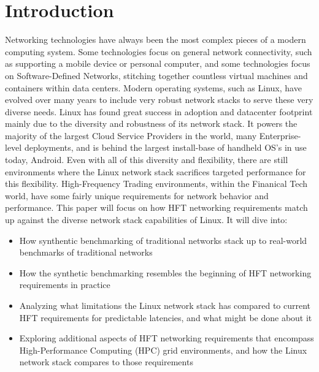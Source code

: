 \documentclass[letterpaper]{article}
\begin{document}
\section{Introduction}
Networking technologies have always been the most complex pieces of a modern computing system. Some technologies focus on general network connectivity, such as supporting a mobile device or personal computer, and some technologies focus on Software-Defined Networks, stitching together countless virtual machines and containers within data centers.
\newline
\newline
Modern operating systems, such as Linux, have evolved over many years to include very robust network stacks to serve these very diverse needs. Linux has found great success in adoption and datacenter footprint mainly due to the diversity and robustness of its network stack. It powers the majority of the largest Cloud Service Providers in the world, many Enterprise-level deployments, and is behind the largest install-base of handheld OS's in use today, Android.
\newline
\newline
Even with all of this diversity and flexibility, there are still environments where the Linux network stack sacrifices targeted performance for this flexibility. High-Frequency Trading environments, within the Finanical Tech world, have some fairly unique requirements for network behavior and performance.
\newline
\newline
This paper will focus on how HFT networking requirements match up against the diverse network stack capabilities of Linux. It will dive into:
\begin{itemize}
\item How synthentic benchmarking of traditional networks stack up to real-world benchmarks of traditional networks
\item How the synthetic benchmarking resembles the beginning of HFT networking requirements in practice
\item Analyzing what limitations the Linux network stack has compared to current HFT requirements for predictable latencies, and what might be done about it
\item Exploring additional aspects of HFT networking requirements that encompass High-Performance Computing (HPC) grid environments, and how the Linux network stack compares to those requirements
\end{itemize}
\let\thefootnote\relax{}
\end{document}
